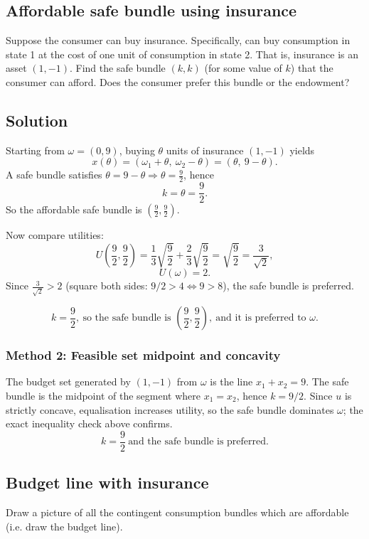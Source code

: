\documentclass[12pt]{article}
\begin{document}
\subsection{Affordable safe bundle using insurance}
Suppose the consumer can buy insurance. Specifically, can buy consumption in state 1
at the cost of one unit of consumption in state 2. That is, insurance is an asset \((1,-1)\).
Find the safe bundle \((k,k)\) (for some value of \(k\)) that the consumer can afford. Does
the consumer prefer this bundle or the endowment?

\subsection*{Solution}
Starting from \(\omega=(0,9)\), buying \(\theta\) units of insurance \((1,-1)\) yields
\[
x(\theta)=(\omega_1+\theta,\ \omega_2-\theta)=(\theta,\ 9-\theta).
\]
A safe bundle satisfies \(\theta=9-\theta\Rightarrow \theta=\frac{9}{2}\), hence
\[
k=\theta=\frac{9}{2}.
\]
So the affordable safe bundle is \(\left(\frac{9}{2},\frac{9}{2}\right)\).

Now compare utilities:
\[
U\!\left(\frac{9}{2},\frac{9}{2}\right)=\frac13\sqrt{\frac{9}{2}}+\frac23\sqrt{\frac{9}{2}}=\sqrt{\frac{9}{2}}=\frac{3}{\sqrt{2}},
\]
\[
U(\omega)=2.
\]
Since \(\frac{3}{\sqrt{2}}>2\) (square both sides: \(9/2>4\iff 9>8\)), the safe bundle is preferred.

\[
\boxed{\;k=\frac{9}{2},\ \text{so the safe bundle is }\left(\frac{9}{2},\frac{9}{2}\right),\ \text{and it is preferred to }\omega.\;}
\]

\subsubsection*{Method 2: Feasible set midpoint and concavity}
The budget set generated by \((1,-1)\) from \(\omega\) is the line \(x_1+x_2=9\). The safe bundle is the midpoint of the segment where \(x_1=x_2\), hence \(k=9/2\). Since \(u\) is strictly concave, equalisation increases utility, so the safe bundle dominates \(\omega\); the exact inequality check above confirms.
\[
\boxed{\;k=\frac{9}{2}\ \text{and the safe bundle is preferred.}\;}
\]

\subsection{Budget line with insurance}
Draw a picture of all the contingent consumption bundles which are affordable (i.e.
draw the budget line).
\end{document}
